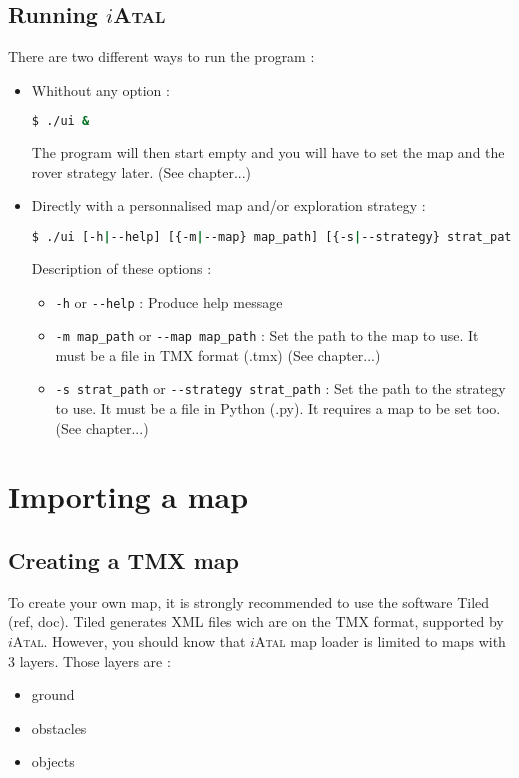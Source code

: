 \documentclass[a4paper,11pt]{article}
\newcommand\iAtal{$i$\textsc{Atal}}
\begin{document}
\subsection{Running \iAtal{}}
There are two different ways to run the program :
\begin{itemize}
\item Whithout any option :
\begin{lstlisting}[language=sh]
$ ./ui &
\end{lstlisting}
  The program will then start empty and you will have to set the map
  and the rover strategy later. (See chapter...)
  
\item Directly with a personnalised map and/or exploration strategy :
\begin{lstlisting}[language=sh]
$ ./ui [-h|--help] [{-m|--map} map_path] [{-s|--strategy} strat_path]
\end{lstlisting}
  Description of these options :
  \begin{itemize}
  \item \verb!-h! or \verb!--help! : Produce help message
  \item \verb!-m map_path! or \verb!--map map_path! : Set the path to
    the map to use. It must be a file in TMX format (.tmx) (See
    chapter...)
  \item \verb!-s strat_path! or \verb!--strategy strat_path! : Set the
    path to the strategy to use. It must be a file in Python (.py). It
    requires a map to be set too. (See chapter...)
  \end{itemize}
\end{itemize}

\section{Importing a map}

\subsection{Creating a TMX map}

To create your own map, it is strongly recommended to use the software
Tiled (ref, doc).  Tiled generates XML files wich are on the TMX
format, supported by \iAtal{}. However, you should know that \iAtal{} map
loader is limited to maps with 3 layers. Those layers are :
\begin{itemize}
 \item ground
 \item obstacles
 \item objects
\end{itemize}
\label{avaibleLayers}
\end{document}
